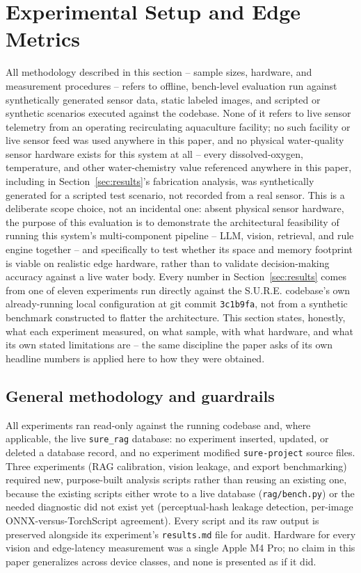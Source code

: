 \section{Experimental Setup and Edge Metrics}
\label{sec:experimental-setup}

All methodology described in this section -- sample sizes, hardware, and measurement procedures --
refers to offline, bench-level evaluation run against synthetically generated sensor data, static
labeled images, and scripted or synthetic scenarios executed against the codebase. None of it refers
to live sensor telemetry from an operating recirculating aquaculture facility; no such facility or
live sensor feed was used anywhere in this paper, and no physical water-quality sensor hardware
exists for this system at all -- every dissolved-oxygen, temperature, and other water-chemistry
value referenced anywhere in this paper, including in Section~\ref{sec:results}'s fabrication
analysis, was synthetically generated for a scripted test scenario, not recorded from a real sensor.
This is a deliberate scope choice, not an incidental one: absent physical sensor hardware, the
purpose of this evaluation is to demonstrate the architectural feasibility of running this system's
multi-component pipeline -- LLM, vision, retrieval, and rule engine together -- and specifically to
test whether its space and memory footprint is viable on realistic edge hardware, rather than to
validate decision-making accuracy against a live water body. Every number in Section~\ref{sec:results}
comes from one of eleven experiments run directly against the S.U.R.E. codebase's own already-running
local configuration at git commit \texttt{3c1b9fa}, not from a synthetic benchmark constructed to
flatter the architecture. This section states, honestly, what each experiment measured, on what
sample, with what hardware, and what its own stated limitations are -- the same discipline the paper
asks of its own headline numbers is applied here to how they were obtained.

\subsection{General methodology and guardrails}

All experiments ran read-only against the running codebase and, where applicable, the live
\texttt{sure\_rag} database: no experiment inserted, updated, or deleted a database record, and
no experiment modified \texttt{sure-project} source files. Three experiments (RAG calibration,
vision leakage, and export benchmarking) required new, purpose-built analysis scripts rather than
reusing an existing one, because the existing scripts either wrote to a live database
(\texttt{rag/bench.py}) or the needed diagnostic did not exist yet (perceptual-hash leakage
detection, per-image ONNX-versus-TorchScript agreement). Every script and its raw output is
preserved alongside its experiment's \texttt{results.md} file for audit. Hardware for every vision
and edge-latency measurement was a single Apple M4 Pro; no claim in this paper generalizes across
device classes, and none is presented as if it did.

